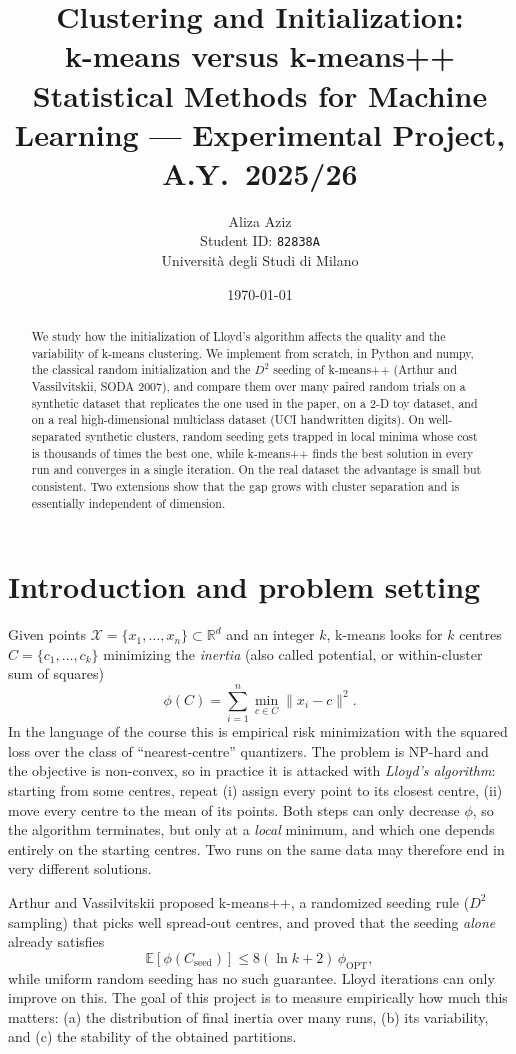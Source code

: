 \documentclass[11pt,a4paper]{article}
\title{Clustering and Initialization:\\ k-means versus k-means++\\[4pt]
\large Statistical Methods for Machine Learning --- Experimental Project, A.Y.\ 2025/26}
\author{Aliza Aziz \\ Student ID: \texttt{82838A} \\ Università degli Studi di Milano}
\date{\today}
\begin{document}
\maketitle

\begin{abstract}
We study how the initialization of Lloyd's algorithm affects the quality and the
variability of k-means clustering. We implement from scratch, in Python and numpy,
the classical random initialization and the $D^2$ seeding of k-means++
(Arthur and Vassilvitskii, SODA 2007), and compare them over many paired random
trials on a synthetic dataset that replicates the one used in the paper, on a 2-D
toy dataset, and on a real high-dimensional multiclass dataset (UCI handwritten
digits). On well-separated synthetic clusters, random seeding gets trapped in
local minima whose cost is thousands of times the best one, while k-means++ finds
the best solution in every run and converges in a single iteration. On the real
dataset the advantage is small but consistent. Two extensions show that the gap
grows with cluster separation and is essentially independent of dimension.
\end{abstract}

\section{Introduction and problem setting}

Given points $\mathcal{X}=\{x_1,\dots,x_n\}\subset\mathbb{R}^d$ and an integer $k$,
k-means looks for $k$ centres $C=\{c_1,\dots,c_k\}$ minimizing the
\emph{inertia} (also called potential, or within-cluster sum of squares)
\begin{equation}\label{eq:phi}
\phi(C)=\sum_{i=1}^n \min_{c\in C}\lVert x_i-c\rVert^2 .
\end{equation}
In the language of the course this is empirical risk minimization with the
squared loss over the class of ``nearest-centre'' quantizers. The problem is
NP-hard and the objective is non-convex, so in practice it is attacked with
\emph{Lloyd's algorithm}: starting from some centres, repeat (i) assign every
point to its closest centre, (ii) move every centre to the mean of its points.
Both steps can only decrease $\phi$, so the algorithm terminates, but only at a
\emph{local} minimum, and which one depends entirely on the starting centres.
Two runs on the same data may therefore end in very different solutions.

Arthur and Vassilvitskii proposed k-means++, a randomized seeding rule ($D^2$
sampling) that picks well spread-out centres, and proved that the seeding
\emph{alone} already satisfies
\begin{equation}\label{eq:bound}
\mathbb{E}[\phi(C_{\text{seed}})]\le 8(\ln k+2)\,\phi_{\mathrm{OPT}},
\end{equation}
while uniform random seeding has no such guarantee. Lloyd iterations can only
improve on this. The goal of this project is to measure empirically how much this
matters: (a) the distribution of final inertia over many runs, (b) its
variability, and (c) the stability of the obtained partitions.
\end{document}
